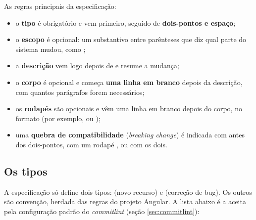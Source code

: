 As regras principais da especificação:

\begin{itemize}
  \item o \textbf{tipo} é obrigatório e vem primeiro, seguido de \textbf{dois-pontos e espaço};
  \item o \textbf{escopo} é opcional: um substantivo entre parênteses que diz qual parte do sistema mudou, como ;
  \item a \textbf{descrição} vem logo depois de \arq{: } e resume a mudança;
  \item o \textbf{corpo} é opcional e começa \textbf{uma linha em branco} depois da descrição, com quantos parágrafos forem necessários;
  \item os \textbf{rodapés} são opcionais e vêm uma linha em branco depois do corpo, no formato  (por exemplo,  ou );
  \item uma \textbf{quebra de compatibilidade} (\emph{breaking change}) é indicada com \arq{!} antes dos dois-pontos, com um rodapé , ou com os dois.
\end{itemize}


\subsection{Os tipos}

A especificação só define dois tipos: \textbf{} (novo recurso) e \textbf{} (correção de bug). Os outros são convenção, herdada das regras do projeto Angular. A lista abaixo é a aceita pela configuração padrão do \emph{commitlint} (seção \ref{sec:commitlint}):

